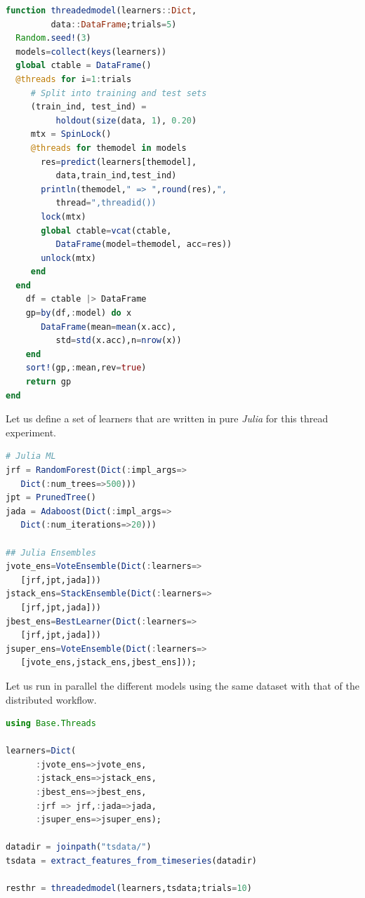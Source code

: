 \documentclass{juliacon}
\begin{document}
\begin{lstlisting}[language = Julia]
function threadedmodel(learners::Dict,
         data::DataFrame;trials=5)
  Random.seed!(3)
  models=collect(keys(learners))
  global ctable = DataFrame()
  @threads for i=1:trials
     # Split into training and test sets
     (train_ind, test_ind) = 
          holdout(size(data, 1), 0.20)
     mtx = SpinLock()
     @threads for themodel in models
       res=predict(learners[themodel],
          data,train_ind,test_ind)
       println(themodel," => ",round(res),", 
          thread=",threadid())
       lock(mtx)
       global ctable=vcat(ctable,
          DataFrame(model=themodel, acc=res))
       unlock(mtx)
     end
  end
    df = ctable |> DataFrame
    gp=by(df,:model) do x
       DataFrame(mean=mean(x.acc),
          std=std(x.acc),n=nrow(x))
    end
    sort!(gp,:mean,rev=true)
    return gp
end
\end{lstlisting}

Let us define a set of learners that are written in pure \emph{Julia} for this thread experiment.

\begin{lstlisting}[language = Julia]
# Julia ML
jrf = RandomForest(Dict(:impl_args=>
   Dict(:num_trees=>500)))
jpt = PrunedTree()
jada = Adaboost(Dict(:impl_args=>
   Dict(:num_iterations=>20)))

## Julia Ensembles
jvote_ens=VoteEnsemble(Dict(:learners=>
   [jrf,jpt,jada]))
jstack_ens=StackEnsemble(Dict(:learners=>
   [jrf,jpt,jada]))
jbest_ens=BestLearner(Dict(:learners=>
   [jrf,jpt,jada]))
jsuper_ens=VoteEnsemble(Dict(:learners=>
   [jvote_ens,jstack_ens,jbest_ens]));
\end{lstlisting}

Let us run in parallel the different models using the same dataset with that of the distributed workflow.

\begin{lstlisting}[language = Julia]
using Base.Threads

learners=Dict(
      :jvote_ens=>jvote_ens,
      :jstack_ens=>jstack_ens,
      :jbest_ens=>jbest_ens,
      :jrf => jrf,:jada=>jada,
      :jsuper_ens=>jsuper_ens);
      
datadir = joinpath("tsdata/")
tsdata = extract_features_from_timeseries(datadir)

resthr = threadedmodel(learners,tsdata;trials=10)
\end{lstlisting}
\end{document}
